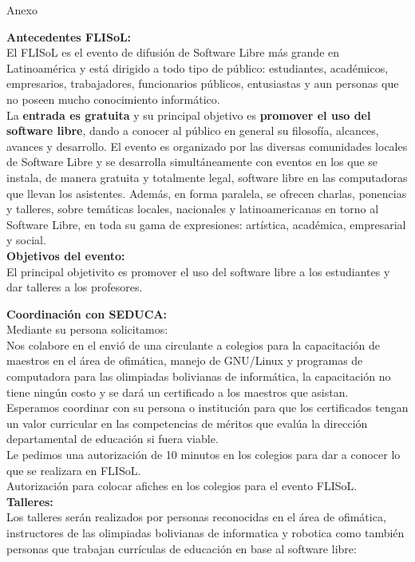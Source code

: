 \documentclass[xcolor, x11names, letterpaper, 12pt]{letter}
\begin{document}
\begin{center}
{\Huge Anexo}
\end{center}

\textbf{Antecedentes FLISoL:}\\

El FLISoL es el evento de difusión de Software Libre más grande en Latinoamérica y está dirigido a todo tipo de público: estudiantes, académicos, empresarios, trabajadores, funcionarios públicos, entusiastas y aun personas que no poseen mucho conocimiento informático.\\

La \textbf{entrada es gratuita} y su principal objetivo es \textbf{promover el uso del software libre}, dando a conocer al público en general su filosofía, alcances, avances y desarrollo.
El evento es organizado por las diversas comunidades locales de Software Libre y se desarrolla simultáneamente con eventos en los que se instala, de manera gratuita y totalmente legal, software libre en las computadoras que llevan los asistentes. Además, en forma paralela, se ofrecen charlas, ponencias y talleres, sobre temáticas locales, nacionales y latinoamericanas en torno al Software Libre, en toda su gama de expresiones: artística, académica, empresarial y social.\\

\textbf{Objetivos del evento:}\\

El principal objetivito es promover el uso del software libre a los estudiantes y dar talleres a los profesores.

\textbf{Coordinación con SEDUCA:}\\
Mediante su persona solicitamos:\\

Nos colabore en el envió de una circulante a colegios para la capacitación de maestros en el área de ofimática, manejo de GNU/Linux y programas de computadora para las olimpiadas bolivianas de informática, la capacitación no tiene ningún costo y se dará un certificado a los maestros que asistan.\\

Esperamos coordinar con su persona o institución para que los certificados tengan un valor curricular en las competencias de méritos que evalúa la dirección departamental de educación si fuera viable.\\

Le pedimos una autorización de 10 minutos en los colegios para dar a conocer lo que se realizara en FLISoL.\\
Autorización para colocar afiches en los colegios para el evento FLISoL.\\
\newpage
\textbf{Talleres:}\\
Los talleres serán realizados por personas reconocidas en el área de ofimática, instructores de las olimpiadas bolivianas de informatica y robotica como también personas que  trabajan  currículas de educación en base al software libre:\\
\end{document}
